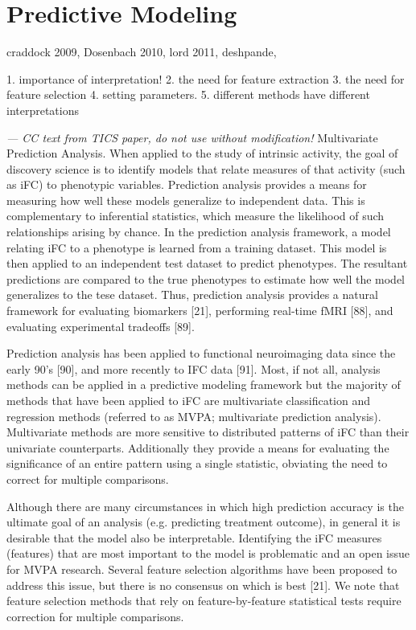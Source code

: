 \documentclass[5p]{elsarticle}
\begin{document}
\section{Predictive Modeling}
craddock 2009, Dosenbach 2010, lord 2011, deshpande, 

1. importance of interpretation!
2. the need for feature extraction
3. the need for feature selection
4. setting parameters.
5. different methods have different interpretations

\emph{ --- CC text from TICS paper, do not use without modification!}
Multivariate Prediction Analysis. When applied to the study of intrinsic activity, the goal of discovery
science is to identify models that relate measures of that activity (such as iFC) to phenotypic variables.
Prediction analysis provides a means for measuring how well these models generalize to independent data.
This is complementary to inferential statistics, which measure the likelihood of such relationships
arising by chance. In the prediction analysis framework, a model relating iFC to a phenotype is learned 
from a training dataset. This model is then applied to an independent test dataset to predict phenotypes.
The resultant predictions are compared to the true phenotypes to estimate how well the model generalizes
to the tese dataset. Thus, prediction analysis provides a natural framework for evaluating biomarkers [21],
performing real-time fMRI [88], and evaluating experimental tradeoffs [89]. 

Prediction analysis has been applied to functional neuroimaging data since the early 90’s [90], and more
recently to IFC data [91]. Most, if not all, analysis methods can be applied in a predictive modeling
framework but the majority of methods that have been applied to iFC are multivariate classification and
regression methods (referred to as MVPA; multivariate prediction analysis). Multivariate methods are more
sensitive to distributed patterns of iFC than their univariate counterparts. Additionally they provide a
means for evaluating the significance of an entire pattern using a single statistic, obviating the need
to correct for multiple comparisons. 

Although there are many circumstances in which high prediction accuracy is the ultimate goal of an
analysis (e.g. predicting treatment outcome), in general it is desirable that the model also be
interpretable. Identifying the iFC measures (features) that are most important to the model is
problematic and an open issue for MVPA research. Several feature selection algorithms have been proposed
to address this issue, but there is no consensus on which is best [21]. We note that feature selection
methods that rely on feature-by-feature statistical tests require correction for multiple comparisons. 
\end{document}
